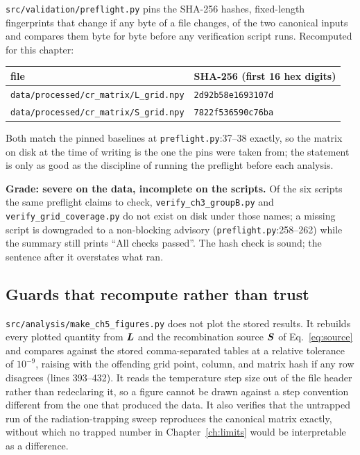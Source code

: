 \texttt{src/validation/preflight.py} pins the SHA-256 hashes, fixed-length
fingerprints that change if any byte of a file changes, of the two canonical
inputs and compares them byte for byte before any verification script
runs. Recomputed for this chapter:
\begin{center}
\begin{tabular}{ll}
  \toprule
  file & SHA-256 (first 16 hex digits) \\
  \midrule
  \texttt{data/processed/cr\_matrix/L\_grid.npy} & \texttt{2d92b58e1693107d} \\
  \texttt{data/processed/cr\_matrix/S\_grid.npy} & \texttt{7822f536590c76ba} \\
  \bottomrule
\end{tabular}
\end{center}
Both match the pinned baselines at \texttt{preflight.py}:37--38 exactly, so the
matrix on disk at the time of writing is the one the pins were taken from; the
statement is only as good as the discipline of running the preflight before
each analysis.

\textbf{Grade: severe on the data, incomplete on the scripts.} Of the six
scripts the same preflight claims to check, \texttt{verify\_ch3\_groupB.py} and
\texttt{verify\_grid\_coverage.py} do not exist on disk under those names; a
missing script is downgraded to a non-blocking advisory
(\texttt{preflight.py}:258--262) while the summary still prints ``All checks
passed''. The hash check is sound; the sentence after it overstates what ran.

\subsection{Guards that recompute rather than trust}

\texttt{src/analysis/make\_ch5\_figures.py} does not plot the stored results. It
rebuilds every plotted quantity from $\bm{L}$ and the recombination source
$\bm{S}$ of Eq.~\eqref{eq:source} and compares against
the stored comma-separated tables at a relative tolerance of $10^{-9}$, raising
with the offending grid point, column, and matrix hash if any row disagrees
(lines 393--432). It reads the temperature step size out of the file header
rather than redeclaring it, so a figure cannot be drawn against a step
convention different from the one that produced the data. It also verifies that
the untrapped run of the radiation-trapping sweep reproduces the canonical
matrix exactly, without which no trapped number in Chapter~\ref{ch:limits} would
be interpretable as a difference.

